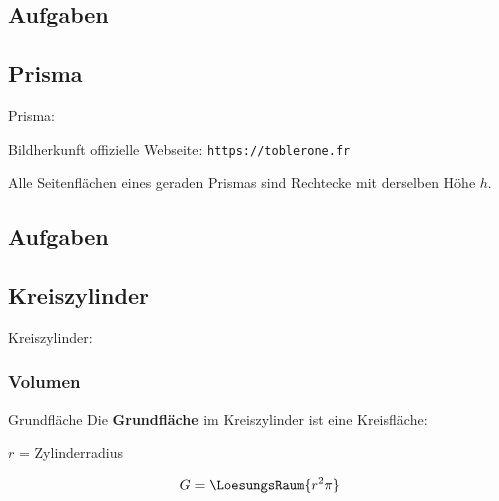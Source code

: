 \subsection*{Aufgaben}

\newpage


\subsection{Prisma}
Prisma: 

\begin{center}Bildherkunft offizielle Webseite: \texttt{https://toblerone.fr}\end{center}


\begin{bemerkung}{}{}
  Alle Seitenflächen eines geraden Prismas sind Rechtecke mit derselben Höhe $h$.
  \end{bemerkung}

\subsection*{Aufgaben}

\newpage


\subsection{Kreiszylinder}

Kreiszylinder: 


\subsubsection{Volumen}

\begin{bemerkung}{Grundfläche}{}
  Die \textbf{Grundfläche} im Kreiszylinder ist eine Kreisfläche:

  $r$ = Zylinderradius
  
  $$G = \LoesungsRaum{r^2\pi}$$
\end{bemerkung}

